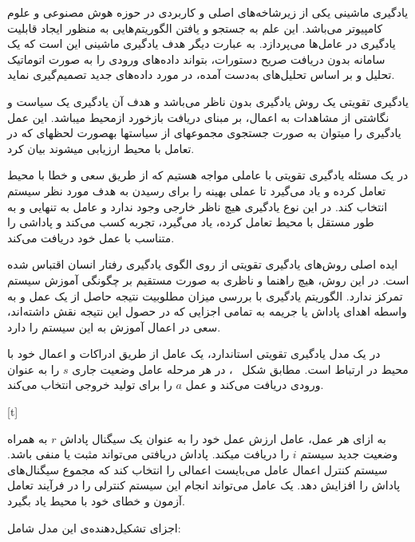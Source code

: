 
یادگیری ماشینی یکی از زیرشاخه‌های اصلی و کاربردی در حوزه هوش مصنوعی و علوم کامپیوتر می‌باشد. این علم به جستجو و یافتن الگوریتم‌هایی به منظور ایجاد قابلیت یادگیری در عامل‌ها می‌پردازد. به عبارت دیگر هدف یادگیری ماشینی این است که یک سامانه بدون دریافت صریح دستورات، بتواند داده‌های ورودی را به صورت اتوماتیک تحلیل و بر اساس تحلیل‌های به‌دست آمده، در مورد داده‌های جدید
تصمیم‌گیری نماید.


یادگیری تقویتی یک روش یادگیری بدون ناظر می‌باشد و هدف آن یادگیری یک سیاست و نگاشتی از مشاهدات به اعمال، بر مبنای دریافت بازخورد ازمحیط میباشد. این عمل یادگیری را میتوان به صورت جستجوی مجموعهای از سیاستها بهصورت لحظهای که در تعامل با محیط ارزیابی میشوند بیان کرد.

در یک مسئله یادگیری تقویتی با عاملی مواجه هستیم که از طریق سعی و خطا با محیط تعامل کرده و یاد می‌گیرد تا عملی بهینه را برای رسیدن به هدف مورد نظر سیستم انتخاب کند. در این نوع یادگیری هیچ ناظر خارجی وجود ندارد و عامل به تنهایی و به طور مستقل با محیط تعامل کرده، یاد می‌گیرد، تجربه کسب
می‌کند و پاداشی را متناسب با عمل خود دریافت می‌کند.

ایده اصلی روش‌های یادگیری تقویتی از روی الگوی یادگیری رفتار انسان اقتباس شده است. در این
روش، هیچ راهنما و ناظری به صورت مستقیم بر چگونگی آموزش سیستم تمرکز ندارد. الگوریتم یادگیری با بررسی میزان مطلوبیت نتیجه حاصل از یک عمل و به واسطه اهدای پاداش یا جریمه به تمامی اجزایی که در
حصول این نتیجه نقش داشته‌اند، سعی در اعمال آموزش به این سیستم را دارد.


در یک مدل یادگیری تقویتی استاندارد، یک عامل از طریق ادراکات و اعمال خود با محیط در ارتباط
است. مطابق شکل ~، در هر مرحله عامل وضعیت جاری $s$ را به عنوان ورودی دریافت می‌کند و عمل $a$ را برای تولید خروجی انتخاب می‌کند.

[t]

به ازای هر عمل، عامل ارزش عمل خود را به عنوان یک سیگنال پاداش
$r$ به همراه وضعیت جدید سیستم $i$ را دریافت میکند. پاداش دریافتی می‌تواند مثبت یا منفی باشد. سیستم  کنترل اعمال عامل می‌بایست اعمالی را انتخاب کند که مجموع سیگنال‌های پاداش را افزایش دهد. یک عامل
می‌تواند انجام این سیستم کنترلی را در فرآیند تعامل آزمون و خطای خود با محیط یاد بگیرد.

اجزای تشکیل‌دهنده‌ی این مدل شامل:

